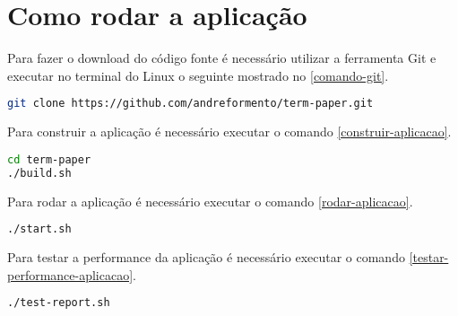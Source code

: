 
\section{Como rodar a aplicação}\label{como-rodar-a-aplicacao}

Para fazer o download do código fonte é necessário utilizar a ferramenta Git
e executar no terminal do Linux o seguinte mostrado no \autoref{comando-git}.


\begin{lstlisting}[language=bash,label=comando-git,caption=Como fazer o download do código fonte com o Git]
git clone https://github.com/andreformento/term-paper.git
\end{lstlisting}

Para construir a aplicação é necessário executar o comando
\autoref{construir-aplicacao}.

\begin{lstlisting}[language=bash,label=construir-aplicacao,caption=Como construir a aplicação]
cd term-paper
./build.sh
\end{lstlisting}

Para rodar a aplicação é necessário executar o comando
\autoref{rodar-aplicacao}.

\begin{lstlisting}[language=bash,label=rodar-aplicacao,caption=Como rodar a aplicação]
./start.sh
\end{lstlisting}

Para testar a performance da aplicação é necessário executar o comando
\autoref{testar-performance-aplicacao}.

\begin{lstlisting}[language=bash,label=testar-performance-aplicacao,caption=Como testar a performance da aplicação]
./test-report.sh
\end{lstlisting}





